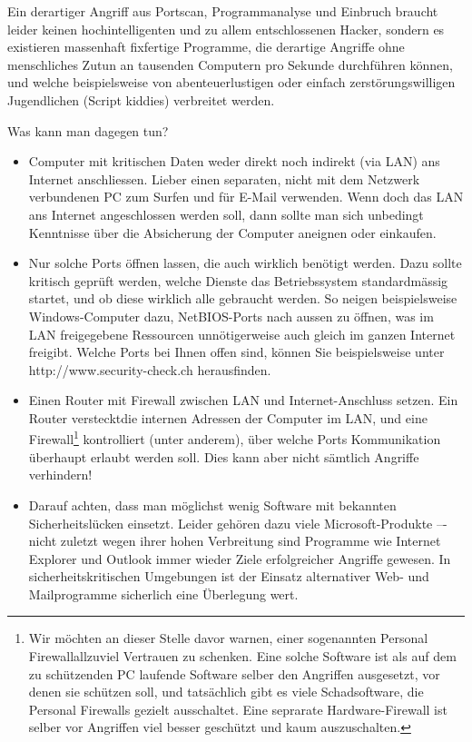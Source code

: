 Ein derartiger Angriff aus Portscan, Programmanalyse und Einbruch braucht leider keinen hochintelligenten und zu allem entschlossenen
Hacker, sondern es existieren massenhaft fixfertige Programme, die derartige Angriffe ohne menschliches Zutun an tausenden Computern
pro Sekunde durchführen können, und welche beispielsweise von abenteuerlustigen oder einfach zerstörungswilligen Jugendlichen
(\glqq Script kiddies\grqq) verbreitet werden.

Was kann man dagegen tun?
\begin{itemize}
  \item {Computer mit kritischen Daten weder direkt noch indirekt (via LAN) ans
  Internet anschliessen. Lieber einen separaten, nicht mit dem Netzwerk verbundenen PC zum Surfen und für E-Mail
  verwenden.
  Wenn doch das LAN ans Internet angeschlossen werden soll, dann sollte man sich unbedingt Kenntnisse über die Absicherung der
   Computer aneignen oder einkaufen.}
  \item  {Nur solche Ports öffnen lassen, die auch wirklich benötigt werden. Dazu sollte kritisch geprüft werden, welche
  Dienste das Betriebssystem standardmässig startet, und ob diese wirklich alle gebraucht werden. So neigen beispielsweise
  Windows-Computer dazu, NetBIOS-Ports nach aussen zu öffnen, was im LAN freigegebene Ressourcen unnötigerweise auch gleich
   im ganzen Internet freigibt. Welche Ports bei Ihnen offen sind, können Sie beispielsweise unter http://www.security-check.ch herausfinden.}
  \item{Einen Router mit Firewall zwischen LAN und Internet-Anschluss setzen.
  Ein Router \glqq versteckt\grqq{}die internen Adressen der Computer im LAN,
  und eine Firewall\footnote{Wir möchten an dieser Stelle davor warnen, einer
  sogenannten \glqq Personal Firewall\grqq{}allzuviel Vertrauen zu schenken.
  Eine solche Software ist als auf dem zu schützenden PC laufende Software
  selber den Angriffen ausgesetzt, vor denen sie schützen soll, und tatsächlich
  gibt es viele Schadsoftware, die Personal Firewalls gezielt ausschaltet. Eine
  seprarate Hardware-Firewall ist selber vor Angriffen viel besser geschützt und
  kaum auszuschalten.} kontrolliert (unter anderem),
  über welche Ports Kommunikation überhaupt erlaubt werden soll. Dies kann
  aber nicht sämtlich Angriffe verhindern!}
  \item {Darauf achten, dass man möglichst wenig Software mit bekannten Sicherheitslücken einsetzt. Leider gehören dazu viele
  Microsoft-Produkte –- nicht zuletzt wegen ihrer hohen Verbreitung sind Programme wie Internet Explorer und Outlook immer wieder
  Ziele erfolgreicher Angriffe gewesen.
  In sicherheitskritischen Umgebungen ist der Einsatz alternativer Web- und Mailprogramme sicherlich eine Überlegung wert.}
\end{itemize}

